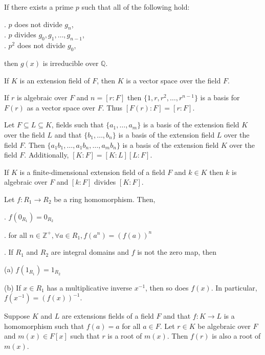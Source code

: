 \documentclass{article}
\newcommand\inv{^{-1}}
\newcommand{\Z}{\mathbb Z}
\newcommand{\Q}{\mathbb Q}
\begin{document}
If there exists a prime $p$ such that all of the following hold:

\indent{}. $p$ does not divide $g_n$, \\
\indent{}. $p$ divides $g_0, g_1, \hdots, g_{n-1}$, \\
\indent{}. $p^2$ does not divide $g_0$,

then $g(x)$ is irreducible over $\Q$.

\newpage


If $K$ is an extension field of $F$, then $K$ is a vector space over the field $F$.


If $r$ is algebraic over $F$ and $n=[r:F]$ then $\{1,r,r^2,\hdots, r^{n-1}\}$ is a basis for $F(r)$ as a vector space over $F$. Thus $[F(r):F]=[r:F]$.


Let $F\subseteq L \subseteq K$, fields such that $\{a_1,\hdots,a_m\}$ is a basis of the extension field $K$ over the field $L$ and that $\{b_1,\hdots,b_n\} $ is a basis of the extension field $L$ over the field $F$. Then $\{a_1b_1,\hdots,a_1b_n,\hdots,a_mb_n\}$ is a basis of the extension field $K$ over the field $F$. Additionally, $[K:F]=[K:L][L:F]$.


If $K$ is a finite-dimensional extension field of a field $F$ and $k\in K$ then $k$ is algebraic over $F$ and $[k:F]$ divides $[K:F]$.

\newpage


Let $f:R_1\to R_2$ be a ring homomorphism. Then,

\indent{}. $f(0_{R_1}) = 0_{R_2}$

\indent{}. for all $n\in\Z^+, \forall a\in R_1, f(a^n) = (f(a))^n$

\indent{}. If $R_1$ and $R_2$ are integral domains and $f$ is not the zero map, then

\indent\indent\indent(a) $f(1_{R_1}) = 1_{R_2}$

\indent\indent\indent(b) If $x\in R_1$ has a multiplicative inverse $x^{-1}$, then so does $f(x)$. In particular, $f(x\inv)=(f(x))\inv$.


Suppose $K$ and $L$ are extensions fields of a field $F$ and that $f:K\to L$ is a homomorphism such that $f(a)=a$ for all $a\in F$. Let $r\in K$ be algebraic over $F$ and $m(x)\in F[x]$ such that $r$ is a root of $m(x)$. Then $f(r)$ is also a root of $m(x)$.
\end{document}
